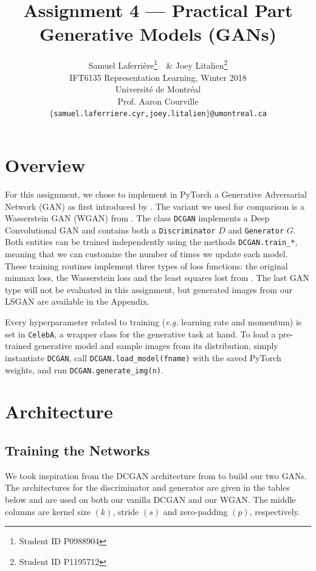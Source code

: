 \documentclass[table]{article}
\title{Assignment 4 --- Practical Part \\
Generative Models (GANs)}
\author{Samuel Laferri\`ere\thanks{Student ID P0988904}\ \, \& Joey Litalien\thanks{Student ID P1195712} \\
IFT6135 Representation Learning, Winter 2018\\
Universit\'e de Montr\'eal\\
Prof. Aaron Courville \\
\texttt{$\{$samuel.laferriere.cyr,joey.litalien$\}$@umontreal.ca}}
\def\*#1{\mathbf{#1}}
\newcommand{\code}[1]{{\color{Blue}\small\texttt{#1}}}
\begin{document}
\maketitle
\thispagestyle{empty}

\section{Overview}

For this assignment, we chose to implement in PyTorch a Generative Adversarial Network (GAN) as first introduced by \cite{gan}. The variant we used for comparison is a Wasserstein GAN (WGAN) from \cite{wgan}. The class \code{DCGAN} implements a Deep Convolutional GAN and contains both a \code{Discriminator} $D$ and \code{Generator} $G$. Both entities can be trained independently using the methods \code{DCGAN.train\_*}, meaning that we can customize the number of times we update each model. These training routines implement three types of loss functions: the original minmax loss, the Wasserstein loss and the least squares lost from \cite{lsgan}. The last GAN type will not be evaluated in this assignment, but generated images from our LSGAN are available in the Appendix.

Every hyperparameter related to training (\textit{e.g.} learning rate and momentum) is set in \code{CelebA}, a wrapper class for the generative task at hand. To load a pre-trained generative model and sample images from its distribution, simply instantiate \code{DCGAN}, call \code{DCGAN.load_model(fname)} with the saved PyTorch weights, and run \code{DCGAN.generate_img(n)}.


\section{Architecture}
\subsection{Training the Networks}

We took inspiration from the DCGAN architecture from \cite{dcgan} to build our two GANs. The architectures for the discriminator and generator are given in the tables below and are used on both our vanilla DCGAN and our WGAN. The middle columns are kernel size $(k)$, stride $(s)$ and zero-padding $(p)$, respectively.
\end{document}
